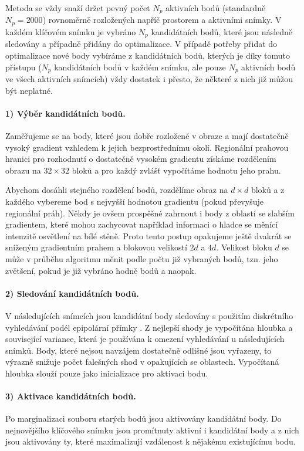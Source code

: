 \documentclass[12pt,a4paper]{report}
\begin{document}
Metoda se vždy snaží držet pevný počet \( N_p \) aktivních bodů (standardně \( N_p = 2000 \)) rovnoměrně rozložených napříč prostorem a aktivními snímky. V každém klíčovém snímku je vybráno \( N_p \) kandidátních bodů, které jsou následně sledovány a případně přidány do optimalizace. V případě potřeby přidat do optimalizace nové body vybíráme z kandidátních bodů, kterých je díky tomuto přístupu (\( N_p \) kandidátních bodů v každém snímku, ale pouze \( N_p \) aktivních bodů ve všech aktivních snímcích) vždy dostatek i přesto, že některé z nich již můžou být neplatné.

\paragraph*{1) Výběr kandidátních bodů.} Zaměřujeme se na body, které jsou dobře rozložené v obraze a mají dostatečně vysoký gradient vzhledem k jejich bezprostřednímu okolí. Regionální prahovou hranici pro rozhodnutí o dostatečně vysokém gradientu získáme rozdělením obrazu na \( 32 \times 32 \) bloků a pro každý zvlášť vypočítáme hodnotu jeho prahu.

Abychom dosáhli stejného rozdělení bodů, rozdělíme obraz na \( d \times d \) bloků a z každého vybereme bod s nejvyšší hodnotou gradientu (pokud převyšuje regionální práh). Někdy je ovšem prospěšné zahrnout i body z oblastí se slabším gradientem, které mohou zachycovat například informaci o hladce se měnící intenzitě osvětlení na bílé stěně. Proto tento postup opakujeme ještě dvakrát se sníženým gradientním prahem a blokovou velikostí \( 2d \) a \( 4d \). Velikost bloku \( d \) se může v průběhu algoritmu měnit podle počtu již vybraných bodů, tzn. jeho zvětšení, pokud je již vybráno hodně bodů a naopak.

\paragraph*{2) Sledování kandidátních bodů.} V následujících snímcích jsou kandidátní body sledovány s použitím diskrétního vyhledávání podél epipolární přímky \cite{Engel2018_DSO}. Z nejlepší shody je vypočítána hloubka a související variance, která je používána k omezení vyhledávání u následujících snímků. Body, které nejsou navzájem dostatečně odlišné jsou vyřazeny, to výrazně snižuje počet falešných shod v opakujících se oblastech. Vypočítaná hloubka slouží pouze jako inicializace pro aktivaci bodu.

\paragraph*{3) Aktivace kandidátních bodů.} Po marginalizaci souboru starých bodů jsou aktivovány kandidátní body. Do nejnovějšího klíčového snímku jsou promítnuty aktivní i kandidátní body a z nich jsou aktivovány ty, které maximalizují vzdálenost k nějakému existujícímu bodu.
\end{document}
